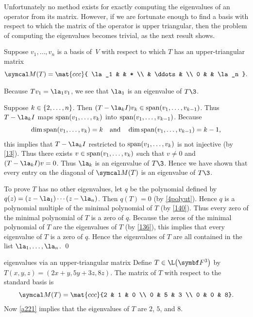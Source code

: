 Unfortunately no method exists for exactly computing the eigenvalues of an operator
from its matrix.  However, if we are fortunate enough to find a basis with respect to which the matrix of the operator is upper
triangular, then the problem of computing the eigenvalues becomes trivial, as the next result shows.


\proof
Suppose $v_1, \dots, v_n$ is a basis of~$V$ with respect to which $T$ has an
upper-triangular matrix
\[
\M(T) = \mat{ccc}{
\la_1 & & * \\
&  \ddots & \\
0 & & \la_n }.
\]

Because $Tv_1 = \la_1 v_1$, we see that $\la_1$ is an eigenvalue of $T\3$.

Suppose $k \in \{2, \ldots, n\}$. Then $(T - \la_k I)v_k \in \Span(v_1, \dots, v_{k-1})$. Thus $T - \la_k I$ maps $\operatorname{span}(v_1, \dots, v_k)$ into $\operatorname{span}(v_1, \dots, v_{k-1})$. Because
\[
\dim \operatorname{span}(v_1, \dots, v_k) = k \quad \text{and} \quad  \dim \operatorname{span}(v_1, \dots, v_{k-1}) = k-1,
\]
this implies that $T- \la_k I$ restricted to $\operatorname{span}(v_1, \dots, v_k)$ is not injective (by \ref{13}). Thus there exists
$v \in \operatorname{span}(v_1, \dots, v_k) $ such that $v \ne 0$ and $(T - \la_k I)v = 0$. Thus $\la_k$ is an eigenvalue of $T\3$. Hence we have shown that every entry on the diagonal of $\M(T)$ is an eigenvalue of $T\3$.

To prove $T$ has no other eigenvalues, let $q$ be the polynomial defined by $q(z) = (z-\la_1)\cdots(z-\la_n)$. Then $q(T) = 0$ (by \ref{4polyut}). Hence $q$ is a polynomial multiple of the minimal polynomial of $T$ (by \ref{140}). Thus every zero of the minimal polynomial of $T$ is a zero of $q$. Because the zeros of the minimal polynomial of $T$ are the eigenvalues of $T$ (by \ref{136}), this implies that every eigenvalue of $T$ is a zero of $q$. Hence the eigenvalues of $T$ are all contained in the list
$\la_1, \ldots, \la_n$.
\qed

\begin{example}{eigenvalues via an upper-triangular matrix}
Define $T \in \L\paren[\big]{\F3}$ by $T(x, y, z) = (2x + y, 5y + 3z, 8z)$. The matrix of $T$ with respect to the standard basis is
\[
\M(T) = \mat{ccc}{2 & 1 & 0 \\
0 & 5 & 3 \\
0 & 0 & 8}.
\]
Now \ref{a221} implies that the eigenvalues of $T$ are $2$, $5$, and $8$.
\end{example}

